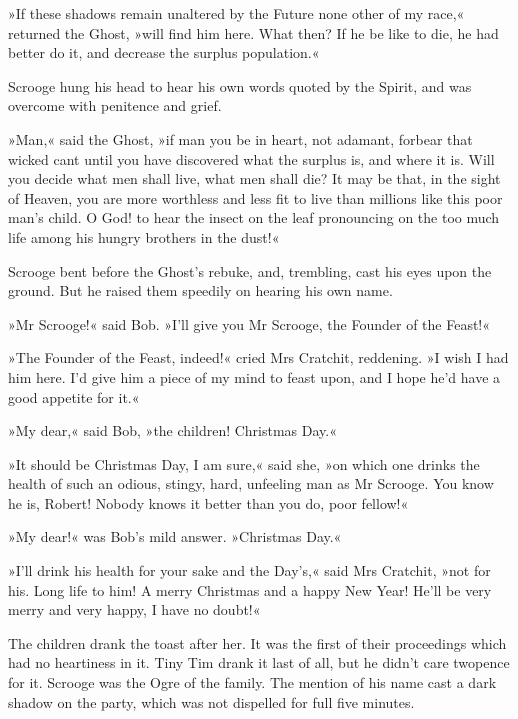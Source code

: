 »If these shadows remain unaltered by the Future none other of my race,« returned the Ghost, »will find him here. What then? If he be like to die, he had better do it, and decrease the surplus population.«

Scrooge hung his head to hear his own words quoted by the Spirit, and was overcome with penitence and grief.

»Man,« said the Ghost, »if man you be in heart, not adamant, forbear that wicked cant until you have discovered what the surplus is, and where it is. Will you decide what men shall live, what men shall die? It may be that, in the sight of Heaven, you are more worthless and less fit to live than millions like this poor man's child. O God! to hear the insect on the leaf pronouncing on the too much life among his hungry brothers in the dust!«

Scrooge bent before the Ghost's rebuke, and, trembling, cast his eyes upon the ground. But he raised them speedily on hearing his own name.

»Mr Scrooge!« said Bob. »I'll give you Mr Scrooge, the Founder of the Feast!«

»The Founder of the Feast, indeed!« cried Mrs Cratchit, reddening. »I wish I had him here. I'd give him a piece of my mind to feast upon, and I hope he'd have a good appetite for it.«

»My dear,« said Bob, »the children! Christmas Day.«

»It should be Christmas Day, I am sure,« said she, »on which one drinks the health of such an odious, stingy, hard, unfeeling man as Mr Scrooge. You know he is, Robert! Nobody knows it better than you do, poor fellow!«

»My dear!« was Bob's mild answer. »Christmas Day.«

»I'll drink his health for your sake and the Day's,« said Mrs Cratchit, »not for his. Long life to him! A merry Christmas and a happy New Year! He'll be very merry and very happy, I have no doubt!«

The children drank the toast after her. It was the first of their proceedings which had no heartiness in it. Tiny Tim drank it last of all, but he didn't care twopence for it. Scrooge was the Ogre of the family. The mention of his name cast a dark shadow on the party, which was not dispelled for full five minutes.

